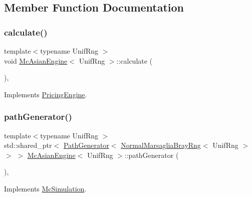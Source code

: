 \subsection{Member Function Documentation}
\hypertarget{class_mc_asian_engine_a4e67149307de395f821c8aa07afad3b8}{}\label{class_mc_asian_engine_a4e67149307de395f821c8aa07afad3b8} 
\subsubsection{\texorpdfstring{calculate()}{calculate()}}
{\footnotesize\ttfamily template$<$typename Unif\+Rng $>$ \\
void \hyperlink{class_mc_asian_engine}{Mc\+Asian\+Engine}$<$ Unif\+Rng $>$\+::calculate (\begin{DoxyParamCaption}{ }\end{DoxyParamCaption})\hspace{0.3cm}{\ttfamily [override]}, {\ttfamily [virtual]}}



Implements \hyperlink{class_pricing_engine_a733511ffc3cf5e4dc1fbc2a39208d8bd}{Pricing\+Engine}.

\hypertarget{class_mc_asian_engine_a93c9216b38bcbe0fe7e8131bf975dbc2}{}\label{class_mc_asian_engine_a93c9216b38bcbe0fe7e8131bf975dbc2} 
\subsubsection{\texorpdfstring{path\+Generator()}{pathGenerator()}}
{\footnotesize\ttfamily template$<$typename Unif\+Rng $>$ \\
std\+::shared\+\_\+ptr$<$ \hyperlink{class_path_generator}{Path\+Generator}$<$ \hyperlink{class_normal_marsaglia_bray_rng}{Normal\+Marsaglia\+Bray\+Rng}$<$ Unif\+Rng $>$ $>$ $>$ \hyperlink{class_mc_asian_engine}{Mc\+Asian\+Engine}$<$ Unif\+Rng $>$\+::path\+Generator (\begin{DoxyParamCaption}{ }\end{DoxyParamCaption})\hspace{0.3cm}{\ttfamily [override]}, {\ttfamily [virtual]}}



Implements \hyperlink{class_mc_simulation_ada27dc346c81cf3d7aff84188dd12381}{Mc\+Simulation}.

